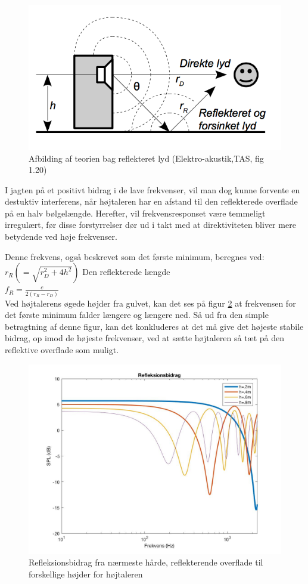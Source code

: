 \begin{figure}[h!]
	\centering
	\includegraphics[width=.7\textwidth]{Pics/reflect}
	\caption{Afbilding af teorien bag reflekteret lyd (Elektro-akustik,TAS, fig 1.20) } 
	\label{fig:reflect}
\end{figure}

I jagten på et positivt bidrag i de lave frekvenser, vil man dog kunne forvente en destuktiv interferens, når højtaleren har en afstand til den reflekterede overflade på en halv bølgelængde. Herefter, vil frekvensresponset være temmeligt irregulært, før disse forstyrrelser dør ud i takt med at direktiviteten bliver mere betydende ved høje frekvenser. 

Denne frekvens, også beskrevet som det første minimum, beregnes ved:\\

\(r_R(=\sqrt{r_D^2+4h^2})\) \hspace{2cm}Den reflekterede længde\\
\(f_R=\frac{c}{2(r_R-r_D)}\)\\

Ved højtalerens øgede højder fra gulvet, kan det ses på figur \ref{fig:refleksionsbidrag} at frekvensen for det første minimum falder længere og længere ned. Så ud fra den simple betragtning af denne figur, kan det konkluderes at det må give det højeste stabile bidrag, op imod de højeste frekvenser, ved at sætte højtaleren så tæt på den reflektive overflade som muligt.

\begin{figure}[h!]
	\centering
	\includegraphics[width=\textwidth]{Pics/refleksionsbidrag}
	\caption{Refleksionsbidrag fra nærmeste hårde, reflekterende overflade til forskellige højder for højtaleren } 
	\label{fig:refleksionsbidrag}
\end{figure}

